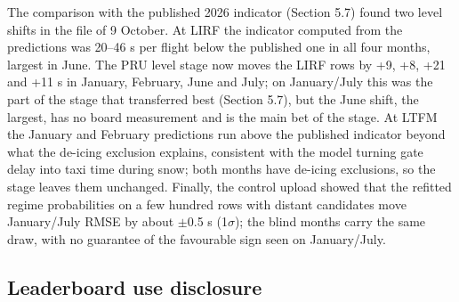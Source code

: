 \documentclass[11pt,a4paper]{article}
\begin{document}
The comparison with the published 2026 indicator (Section 5.7) found two level shifts in the file of 9 October. At LIRF the indicator computed from the predictions was 20--46 s per flight below the published one in all four months, largest in June. The PRU level stage now moves the LIRF rows by +9, +8, +21 and +11 s in January, February, June and July; on January/July this was the part of the stage that transferred best (Section 5.7), but the June shift, the largest, has no board measurement and is the main bet of the stage. At LTFM the January and February predictions run above the published indicator beyond what the de-icing exclusion explains, consistent with the model turning gate delay into taxi time during snow; both months have de-icing exclusions, so the stage leaves them unchanged. Finally, the control upload showed that the refitted regime probabilities on a few hundred rows with distant candidates move January/July RMSE by about $\pm$0.5 s (1$\sigma$); the blind months carry the same draw, with no guarantee of the favourable sign seen on January/July.

\subsection{Leaderboard use disclosure}\label{leaderboard-use-disclosure}
\end{document}
